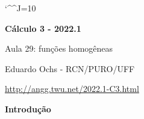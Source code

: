 \documentclass[oneside,12pt]{article}
\begin{document}
\catcode`\^^J=10
\pu
\def\pictgridstyle{\color{GrayPale}\linethickness{0.3pt}}
\def\pictaxesstyle{\linethickness{0.5pt}}
\def\pictnaxesstyle{\color{GrayPale}\linethickness{0.5pt}}
\celllower=2.5pt


\def\u#1{\par{\footnotesize \url{#1}}}

\def\drafturl{http://angg.twu.net/LATEX/2022-1-C3.pdf}
\def\drafturl{http://angg.twu.net/2022.1-C3.html}
\def\draftfooter{\tiny \href{\drafturl}{\jobname{}} \ColorBrown{\shorttoday{} \hours}}

\def\Rq{\ColorRed{?}}


%

\thispagestyle{empty}

\begin{center}

\vspace*{1.2cm}

{\bf \Large Cálculo 3 - 2022.1}

\bsk

Aula 29: funções homogêneas

\bsk

Eduardo Ochs - RCN/PURO/UFF

\url{http://angg.twu.net/2022.1-C3.html}

\end{center}

\newpage


{\bf Introdução}

\def\HH#1{[\text{H}_#1]}
\def\HP#1{[\text{H}'_#1]}
\def\HPP#1{[\text{H}''_#1]}
\def\HHH#1#2#3#4{
  \left(\begin{array}{lrcl}
        F(#3·#1,#3·#2) \;\; = \;\; #3^#4·F(#1,#2) \\
        \end{array}
  \right)}
\def\HHP#1#2#3#4#5#6{
  \left(\begin{array}{lrcl}
        \text{Se}    &  (#3,#4) &=& #5   · (#1,#2) \\
        \text{então} & F(#3,#4) &=& #5^#6·F(#1,#2) \\
        \end{array}
  \right)}
\end{document}

